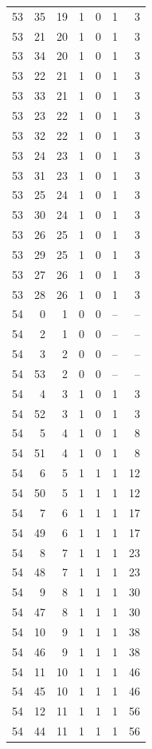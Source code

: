 \begin{longtable}{rrrrrrr}
53 & 35 & 19 & 1 & 0 & 1 & 3\\
53 & 21 & 20 & 1 & 0 & 1 & 3\\
53 & 34 & 20 & 1 & 0 & 1 & 3\\
53 & 22 & 21 & 1 & 0 & 1 & 3\\
53 & 33 & 21 & 1 & 0 & 1 & 3\\
53 & 23 & 22 & 1 & 0 & 1 & 3\\
53 & 32 & 22 & 1 & 0 & 1 & 3\\
53 & 24 & 23 & 1 & 0 & 1 & 3\\
53 & 31 & 23 & 1 & 0 & 1 & 3\\
53 & 25 & 24 & 1 & 0 & 1 & 3\\
53 & 30 & 24 & 1 & 0 & 1 & 3\\
53 & 26 & 25 & 1 & 0 & 1 & 3\\
53 & 29 & 25 & 1 & 0 & 1 & 3\\
53 & 27 & 26 & 1 & 0 & 1 & 3\\
53 & 28 & 26 & 1 & 0 & 1 & 3\\
54 & 0 & 1 & 0 & 0 & -- & --\\
54 & 2 & 1 & 0 & 0 & -- & --\\
54 & 3 & 2 & 0 & 0 & -- & --\\
54 & 53 & 2 & 0 & 0 & -- & --\\
54 & 4 & 3 & 1 & 0 & 1 & 3\\
54 & 52 & 3 & 1 & 0 & 1 & 3\\
54 & 5 & 4 & 1 & 0 & 1 & 8\\
54 & 51 & 4 & 1 & 0 & 1 & 8\\
54 & 6 & 5 & 1 & 1 & 1 & 12\\
54 & 50 & 5 & 1 & 1 & 1 & 12\\
54 & 7 & 6 & 1 & 1 & 1 & 17\\
54 & 49 & 6 & 1 & 1 & 1 & 17\\
54 & 8 & 7 & 1 & 1 & 1 & 23\\
54 & 48 & 7 & 1 & 1 & 1 & 23\\
54 & 9 & 8 & 1 & 1 & 1 & 30\\
54 & 47 & 8 & 1 & 1 & 1 & 30\\
54 & 10 & 9 & 1 & 1 & 1 & 38\\
54 & 46 & 9 & 1 & 1 & 1 & 38\\
54 & 11 & 10 & 1 & 1 & 1 & 46\\
54 & 45 & 10 & 1 & 1 & 1 & 46\\
54 & 12 & 11 & 1 & 1 & 1 & 56\\
54 & 44 & 11 & 1 & 1 & 1 & 56\\

\end{longtable}
